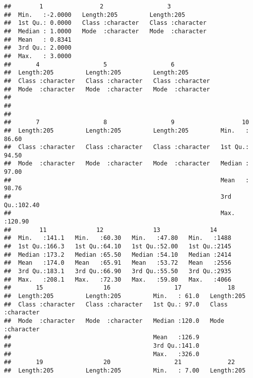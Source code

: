 \documentclass[12pt,]{book}
\theoremstyle{definition}
\theoremstyle{definition}
\theoremstyle{remark}
\begin{document}
\begin{verbatim}
##        1                2                  3            
##  Min.   :-2.0000   Length:205         Length:205        
##  1st Qu.: 0.0000   Class :character   Class :character  
##  Median : 1.0000   Mode  :character   Mode  :character  
##  Mean   : 0.8341                                        
##  3rd Qu.: 2.0000                                        
##  Max.   : 3.0000                                        
##       4                  5                  6            
##  Length:205         Length:205         Length:205        
##  Class :character   Class :character   Class :character  
##  Mode  :character   Mode  :character   Mode  :character  
##                                                          
##                                                          
##                                                          
##       7                  8                  9                   10        
##  Length:205         Length:205         Length:205         Min.   : 86.60  
##  Class :character   Class :character   Class :character   1st Qu.: 94.50  
##  Mode  :character   Mode  :character   Mode  :character   Median : 97.00  
##                                                           Mean   : 98.76  
##                                                           3rd Qu.:102.40  
##                                                           Max.   :120.90  
##        11              12              13              14      
##  Min.   :141.1   Min.   :60.30   Min.   :47.80   Min.   :1488  
##  1st Qu.:166.3   1st Qu.:64.10   1st Qu.:52.00   1st Qu.:2145  
##  Median :173.2   Median :65.50   Median :54.10   Median :2414  
##  Mean   :174.0   Mean   :65.91   Mean   :53.72   Mean   :2556  
##  3rd Qu.:183.1   3rd Qu.:66.90   3rd Qu.:55.50   3rd Qu.:2935  
##  Max.   :208.1   Max.   :72.30   Max.   :59.80   Max.   :4066  
##       15                 16                  17             18           
##  Length:205         Length:205         Min.   : 61.0   Length:205        
##  Class :character   Class :character   1st Qu.: 97.0   Class :character  
##  Mode  :character   Mode  :character   Median :120.0   Mode  :character  
##                                        Mean   :126.9                     
##                                        3rd Qu.:141.0                     
##                                        Max.   :326.0                     
##       19                 20                  21             22           
##  Length:205         Length:205         Min.   : 7.00   Length:205        

\end{verbatim}
\end{document}

